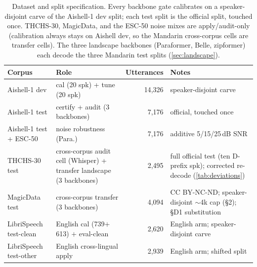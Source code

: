 \documentclass[11pt]{article}
\begin{document}
\begin{table}[h]
  \centering
  \caption{Dataset and split specification. Every backbone gate calibrates on a
  speaker-disjoint carve of the Aishell-1 dev split; each test split is the official
  split, touched once. THCHS-30, MagicData, and the ESC-50 noise mixes are apply/audit-only
  (calibration always stays on Aishell dev, so the Mandarin cross-corpus cells are transfer
  cells). The three landscape backbones (Paraformer, Belle, zipformer) each decode the three
  Mandarin test splits (\cref{sec:landscape}).}
  \label{tab:data}
  \small
  \begin{tabular}{l p{} r p{}}
    \toprule
    Corpus & Role & Utterances & Notes \\
    \midrule
    Aishell-1 dev  & cal (20 spk) + tune (20 spk) & 14{,}326 & speaker-disjoint carve \\
    Aishell-1 test & certify + audit (3 backbones) & 7{,}176 & official, touched once \\
    Aishell-1 test + ESC-50 & noise robustness (Para.) & 7{,}176 & additive 5/15/25\,dB SNR \\
    THCHS-30 test  & cross-corpus audit cell (Whisper) + transfer landscape (3 backbones) & 2{,}495 & full official test (ten D-prefix spk); corrected re-decode (\cref{tab:deviations}) \\
    MagicData test & cross-corpus transfer (3 backbones) & 4{,}094 & CC BY-NC-ND; speaker-disjoint $\sim$4k cap (\S 2); \S D1 substitution \\
    LibriSpeech test-clean & English cal (739$+$613) $+$ eval-clean & 2{,}620 & English arm; speaker-disjoint carve \\
    LibriSpeech test-other & English cross-lingual apply & 2{,}939 & English arm; shifted split \\
    \bottomrule
  \end{tabular}
\end{table}
\end{document}
